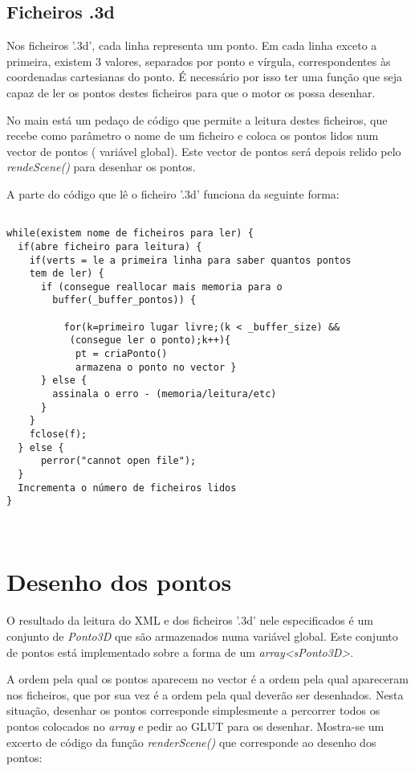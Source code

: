\subsection{Ficheiros .3d}


Nos ficheiros '.3d', cada linha representa um ponto. Em cada linha exceto a primeira, existem 3 valores, separados por ponto e vírgula, correspondentes às coordenadas cartesianas do ponto. É necessário por isso ter uma função que seja capaz de ler os pontos destes ficheiros para que o motor os possa desenhar.

No main está um pedaço de código que permite a leitura destes ficheiros, que recebe como parâmetro o nome de um ficheiro e coloca os pontos lidos num vector de pontos ( variável global). Este vector de pontos será depois relido pelo \textit{rendeScene()} para desenhar os pontos.

A parte do código que lê o ficheiro '.3d' funciona da seguinte forma:


\begin{Verbatim}

while(existem nome de ficheiros para ler) {
  if(abre ficheiro para leitura) {
    if(verts = le a primeira linha para saber quantos pontos 
	tem de ler) {
      if (consegue reallocar mais memoria para o
        buffer(_buffer_pontos)) {
			
          for(k=primeiro lugar livre;(k < _buffer_size) &&
           (consegue ler o ponto);k++){
            pt = criaPonto()
            armazena o ponto no vector }
      } else {
        assinala o erro - (memoria/leitura/etc)
      }
    }
    fclose(f);
  } else {
      perror("cannot open file");
  }
  Incrementa o número de ficheiros lidos
}
 
 
\end{Verbatim}

\section{Desenho dos pontos}

O resultado da leitura do XML e dos ficheiros '.3d' nele especificados é um conjunto de \textit{Ponto3D} que são armazenados numa variável global. Este conjunto de pontos está implementado sobre a forma de um \textit{array<sPonto3D>}. 

A ordem pela qual os pontos aparecem no vector é a ordem pela qual apareceram nos ficheiros, que por sua vez é a ordem pela qual deverão ser desenhados. Nesta situação, desenhar os pontos corresponde simplesmente a percorrer todos os pontos colocados no \textit{array} e pedir ao GLUT para os desenhar. Mostra-se um excerto de código da função \textit{renderScene()} que corresponde ao desenho dos pontos:

